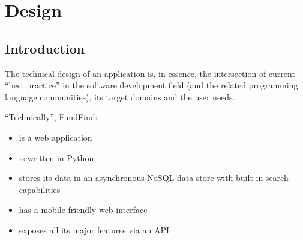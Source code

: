 \chapter{Design}
\label{design}





\section{Introduction}
The technical design of an application is, in essence, the intersection of current ``best practice'' in the software development field (and the related programming language communities), its target domains and the user needs.

``Technically'', FundFind:
\begin{itemize}
 \item is a web application
 \item is written in Python
 \item stores its data in an asynchronous NoSQL data store with built-in search capabilities
 \item has a mobile-friendly web interface
 \item exposes all its major features via an API
\end{itemize}

